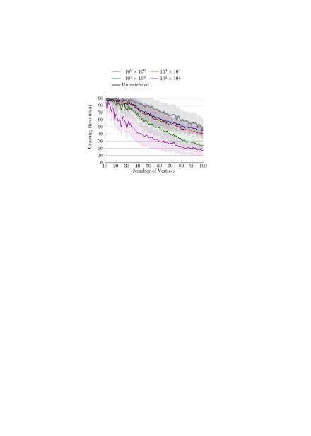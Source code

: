 \documentclass{comjnl}
\begin{document}
\begin{figure}[t!]
{	\includegraphics[scale=0.99,page=2]{figures/grid_colored}}
	

\end{figure}
\end{document}
